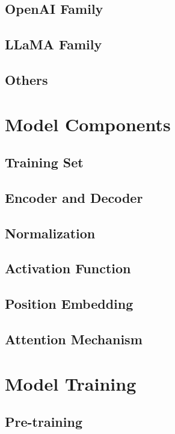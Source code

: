 \subsection{OpenAI Family}

\subsection{LLaMA Family}

\subsection{Others}



\section{Model Components}

\subsection{Training Set}

\subsection{Encoder and Decoder}


\subsection{Normalization}


\subsection{Activation Function}


\subsection{Position Embedding}


\subsection{Attention Mechanism}

\section{Model Training}

\subsection{Pre-training}

